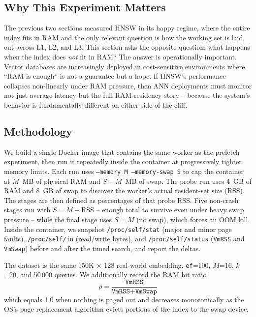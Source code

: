 \documentclass[conference]{IEEEtran}
\begin{document}
\subsection{Why This Experiment Matters}
The previous two sections measured HNSW in its happy regime, where the
entire index fits in RAM and the only relevant question is how the working
set is laid out across L1, L2, and L3. This section asks the opposite
question: what happens when the index does \emph{not} fit in RAM? The
answer is operationally important. Vector databases are increasingly
deployed in cost-sensitive environments where ``RAM is enough'' is not a
guarantee but a hope. If HNSW's performance collapses non-linearly under
RAM pressure, then ANN deployments must monitor not just average latency
but the full RAM-residency story -- because the system's behavior is
fundamentally different on either side of the cliff.

\subsection{Methodology}
We build a single Docker image that contains the same worker as the
prefetch experiment, then run it repeatedly inside the container at
progressively tighter memory limits. Each run uses
\texttt{--memory M --memory-swap S} to cap the container at $M$~MB of
physical RAM and $S{-}M$~MB of swap. The probe run uses 4~GB of RAM and
8~GB of swap to discover the worker's actual resident-set size (RSS).
The stages are then defined as percentages of that probe RSS. Five non-crash
stages run with $S = M + \text{RSS}$ -- enough total to survive even
under heavy swap pressure -- while the final stage uses $S = M$ (no
swap), which forces an OOM kill. Inside the container, we snapshot
\texttt{/proc/self/stat} (major and minor page faults),
\texttt{/proc/self/io} (read/write bytes), and
\texttt{/proc/self/status} (\texttt{VmRSS} and \texttt{VmSwap})
before and after the timed search, and report the deltas.

The dataset is the same 150K $\times$ 128 real-world embedding,
\texttt{ef}=100, $M$=16, $k$=20, and 50\,000 queries. We additionally
record the RAM hit ratio
\begin{equation}
\rho = \frac{\texttt{VmRSS}}{\texttt{VmRSS} + \texttt{VmSwap}}
\end{equation}
which equals 1.0 when nothing is paged out and decreases monotonically
as the OS's page replacement algorithm evicts portions of the index to
the swap device.
\end{document}
